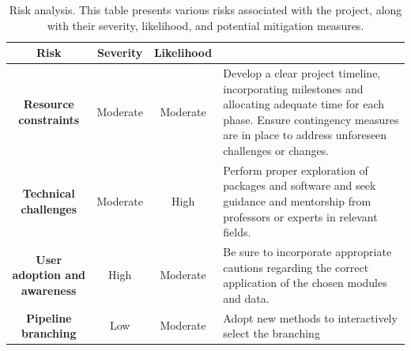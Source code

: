 \documentclass[ENG, BIB]{TFUOC}%
\begin{document}
\begin{table}[!h]
    \centering
    \begin{tabular}{|c|c|c|p{6cm}|}
    \hline
    \rowcolor[HTML]{999999} 
    {\color[HTML]{FFFFFF} \textbf{Risk}} &
      {\color[HTML]{FFFFFF} \textbf{Severity}} &
      {\color[HTML]{FFFFFF} \textbf{Likelihood}} &
      \multicolumn{1}{c|}{\cellcolor[HTML]{999999}{\color[HTML]{FFFFFF} \textbf{Mitigation}}} \\ \hline
    \textbf{Resource constraints} &
      \cellcolor[HTML]{FFE599}Moderate &
      \cellcolor[HTML]{FFE599}Moderate &
      Develop a clear project timeline, incorporating milestones and allocating adequate time for each phase. Ensure contingency measures are in place to address unforeseen challenges or changes. \\ \hline
    \textbf{Technical challenges} &
      \cellcolor[HTML]{FFE599}Moderate &
      \cellcolor[HTML]{EA9999}High &
      Perform proper exploration of packages and software and seek guidance and mentorship from professors or experts in relevant fields. \\ \hline
    \textbf{User adoption and awareness} &
      \cellcolor[HTML]{EA9999}High &
      \cellcolor[HTML]{FFE599}Moderate &
      Be sure to incorporate appropriate cautions regarding the correct application of the chosen modules and data. \\ \hline
    \textbf{Pipeline branching} &
      \cellcolor[HTML]{B6D7A8}Low &
      \cellcolor[HTML]{FFE599}Moderate &
      Adopt new methods to interactively select the branching \\ \hline
    \end{tabular}
    \caption{Risk analysis. This table presents various risks associated with the project, along with
    their severity, likelihood, and potential mitigation measures.}
    \label{tab:risk-analysis}
\end{table}
\end{document}

